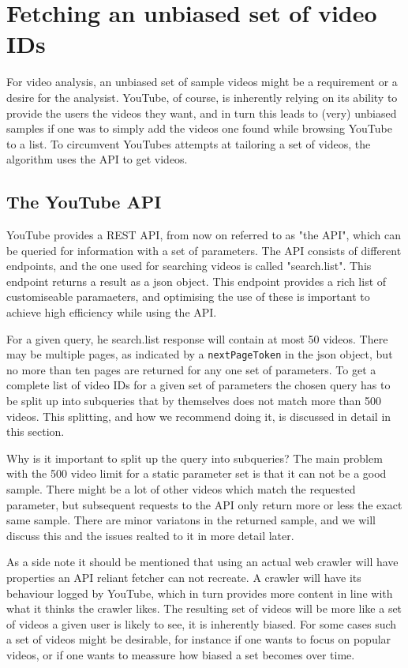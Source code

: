 \section{Fetching an unbiased set of video IDs}
For video analysis, an unbiased set of sample videos might be a requirement or
a desire for the analysist. YouTube, of course, is inherently relying on its
ability to provide the users the videos they want, and in turn this leads to
(very) unbiased samples if one was to simply add the videos one found while
browsing YouTube to a list. To circumvent YouTubes attempts at tailoring a set
of videos, the algorithm uses the API to get videos.

\subsection{The YouTube API}
YouTube provides a REST API, from now on referred to as "the API", which can be
queried for information with a set of parameters. The API consists of different
endpoints, and the one used for searching videos is called "search.list". This
endpoint returns a result as a json object. This endpoint provides a rich list
of customiseable paramaeters, and optimising the use of these is important to
achieve high efficiency while using the API. 

For a given query, he search.list response will contain at most 50 videos. There
may be multiple pages, as indicated by a \texttt{nextPageToken} in the json
object, but no more than ten pages are returned for any one set of parameters.
To get a complete list of video IDs for a given set of parameters the chosen
query has to be split up into subqueries that by themselves does not match more
than 500 videos. This splitting, and how we recommend doing it, is discussed in
detail in this section.

Why is it important to split up the query into subqueries? The main problem with
the 500 video limit for a static parameter set is that it can not be a good
sample. There might be a lot of other videos which match the requested
parameter, but subsequent requests to the API only return more or less the exact
same sample. There are minor variatons in the returned sample, and we will 
discuss this and the issues realted to it in more detail later. 

As a side note it should be mentioned that using an actual web crawler will have
properties an API reliant fetcher can not recreate. A crawler will have its 
behaviour logged by YouTube, which in turn provides more content in line with
what it thinks the crawler likes. The resulting set of videos will be more like
a set of videos a given user is likely to see, it is inherently biased. For some
cases such a set of videos might be desirable, for instance if one wants to
focus on popular videos, or if one wants to meassure how biased a set becomes
over time.

